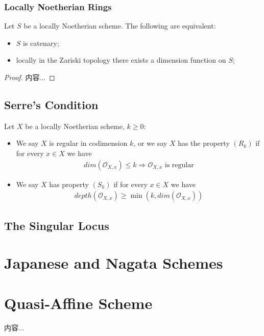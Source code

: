 \documentclass[Total.tex]{subfiles}
\begin{document}
				\subsubsection{Locally Noetherian Rings}
				\begin{lemma}
					Let $S$ be a locally Noetherian scheme. The following are equivalent:
					\begin{itemize}
						\item $S$ is catenary;
						\item locally in the Zariski topology there exists a dimension function on $S$;
					\end{itemize}
				\end{lemma}
				\begin{proof}
					内容...
				\end{proof}
			\subsection{Serre's Condition}
			\begin{Def}
				Let $X$ be a locally Noetherian scheme, $k\geq 0$:
				\begin{itemize}
					\item We say $X$ is regular in codimension $k$, or we say $X$ has the property $(R_k)$ if for every $x\in X$ we have
					\begin{gather*}
						dim(\mathcal{O}_{X,x})\leq k\Rightarrow \mathcal{O}_{X,x}\mbox{ is regular}
					\end{gather*}
					\item We say $X$ has property $(S_k)$ if for every $x\in X$ we have
					\begin{gather*}
						depth(\mathcal{O}_{X,x})\geq \min(k,dim(\mathcal{O}_{X,x}))
					\end{gather*}
				\end{itemize}
			\end{Def}
			\subsection{The Singular Locus}
		\section{Japanese and Nagata Schemes}
		\section{Quasi-Affine Scheme}
		\begin{Def}
			内容...
		\end{Def}
\end{document}
